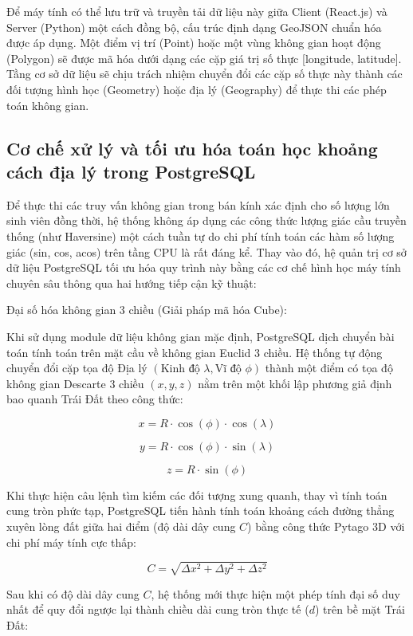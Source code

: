 Để máy tính có thể lưu trữ và truyền tải dữ liệu này giữa Client (React.js) và Server (Python) một cách đồng bộ, cấu trúc định dạng GeoJSON chuẩn hóa được áp dụng\cite{butler2016geojson}. Một điểm vị trí (Point) hoặc một vùng không gian hoạt động (Polygon) sẽ được mã hóa dưới dạng các cặp giá trị số thực [longitude, latitude]. Tầng cơ sở dữ liệu sẽ chịu trách nhiệm chuyển đổi các cặp số thực này thành các đối tượng hình học (Geometry) hoặc địa lý (Geography) để thực thi các phép toán không gian.

\subsection{Cơ chế xử lý và tối ưu hóa toán học khoảng cách địa lý trong PostgreSQL}

Để thực thi các truy vấn không gian trong bán kính xác định cho số lượng lớn sinh viên đồng thời, hệ thống không áp dụng các công thức lượng giác cầu truyền thống (như Haversine) một cách tuần tự do chi phí tính toán các hàm số lượng giác (sin, cos, acos) trên tầng CPU là rất đáng kể. Thay vào đó, hệ quản trị cơ sở dữ liệu PostgreSQL tối ưu hóa quy trình này bằng các cơ chế hình học máy tính chuyên sâu thông qua hai hướng tiếp cận kỹ thuật\cite{orlandini2024postgresql}:

Đại số hóa không gian 3 chiều (Giải pháp mã hóa Cube):

Khi sử dụng module dữ liệu không gian mặc định, PostgreSQL dịch chuyển bài toán tính toán trên mặt cầu về không gian Euclid 3 chiều. Hệ thống tự động chuyển đổi cặp tọa độ Địa lý $(\text{Kinh độ } \lambda, \text{Vĩ độ } \phi)$ thành một điểm có tọa độ không gian Descarte 3 chiều $(x, y, z)$ nằm trên một khối lập phương giả định bao quanh Trái Đất theo công thức:

$$x = R \cdot \cos(\phi) \cdot \cos(\lambda)$$

$$y = R \cdot \cos(\phi) \cdot \sin(\lambda)$$

$$z = R \cdot \sin(\phi)$$

Khi thực hiện câu lệnh tìm kiếm các đối tượng xung quanh, thay vì tính toán cung tròn phức tạp, PostgreSQL tiến hành tính toán khoảng cách đường thẳng xuyên lòng đất giữa hai điểm (độ dài dây cung $C$) bằng công thức Pytago 3D với chi phí máy tính cực thấp:

$$C = \sqrt{\Delta x^2 + \Delta y^2 + \Delta z^2}$$

Sau khi có độ dài dây cung $C$, hệ thống mới thực hiện một phép tính đại số duy nhất để quy đổi ngược lại thành chiều dài cung tròn thực tế ($d$) trên bề mặt Trái Đất:


